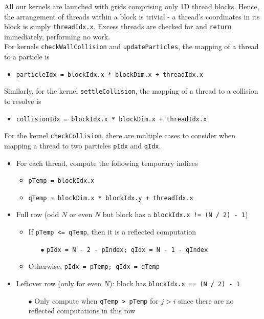 \documentclass[12pt]{article}
\begin{document}
All our kernels are launched with grids comprising only 1D thread blocks. Hence, the arrangement of threads within a block is trivial - a thread's coordinates in its block is simply \texttt{threadIdx.x}. Excess threads are checked for and \texttt{return} immediately, performing no work.\\

For kernels \texttt{checkWallCollision} and \texttt{updateParticles}, the mapping of a thread to a particle is
\begin{itemize}
    \item \texttt{particleIdx = blockIdx.x * blockDim.x + threadIdx.x}
\end{itemize}

Similarly, for the kernel \texttt{settleCollision}, the mapping of a thread to a collision to resolve is
\begin{itemize}
    \item \texttt{collisionIdx = blockIdx.x * blockDim.x + threadIdx.x}
\end{itemize}

\pagebreak

For the kernel \texttt{checkCollision}, there are multiple cases to consider when mapping a thread to two particles \texttt{pIdx} and \texttt{qIdx}.
\begin{itemize}
    \item For each thread, compute the following temporary indices
    \begin{itemize}
        \item \texttt{pTemp = blockIdx.x}
        \item \texttt{qTemp = blockDim.x * blockIdx.y + threadIdx.x}
    \end{itemize}
    \item Full row (odd $N$ or even $N$ but block has a \texttt{blockIdx.x != (N / 2) - 1})
    \begin{itemize}
        \item If \texttt{pTemp <= qTemp}, then it is a reflected computation
        \begin{itemize}
            \item[$\bullet$] \texttt{pIdx = N - 2 - pIndex; qIdx = N - 1 - qIndex}
        \end{itemize}
        \item Otherwise, \texttt{pIdx = pTemp; qIdx = qTemp}
    \end{itemize}
    \item Leftover row (only for even $N$): block has \texttt{blockIdx.x == (N / 2) - 1}
    \begin{itemize}
        \item[$\bullet$] Only compute when \texttt{qTemp > pTemp} for $j > i$ since there are no reflected computations in this row
    \end{itemize}
\end{itemize}
\end{document}
